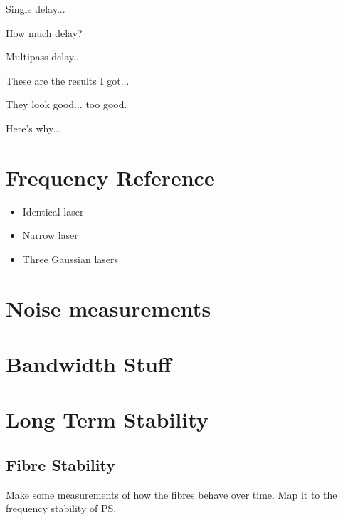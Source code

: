 Single delay...

How much delay?

Multipass delay...

These are the results I got...

They look good... too good.

Here's why...\cite{richter_linewidth_1986}

\section{Frequency Reference}
\begin{itemize}
\item Identical laser
\item Narrow laser
\item Three Gaussian lasers
\end{itemize}

\section{Noise measurements}

\section{Bandwidth Stuff}

\section{Long Term Stability}

\subsection{Fibre Stability}

Make some measurements of how the fibres behave over time. Map it to the frequency stability of PS.

